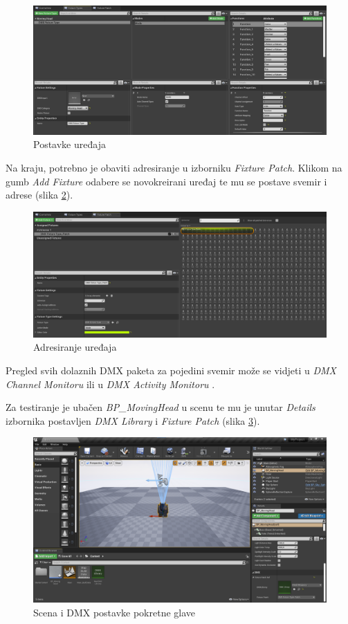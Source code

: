 \documentclass[times, utf8, zavrsni, numeric]{fer}
\begin{document}
\begin{figure}[htp]
	\centering
	\includegraphics[width=\linewidth]{slika 6-2.png}
	\caption{Postavke uređaja}
	\label{fig:slika 6-2}
\end{figure}

Na kraju, potrebno je obaviti adresiranje u izborniku \emph{Fixture Patch}. Klikom na gumb \emph{Add Fixture} odabere se novokreirani uređaj te mu se postave svemir i adrese (slika \ref{fig:slika 6-3}).

\begin{figure}[htp]
	\centering
	\includegraphics[width=\linewidth]{slika 6-3.png}
	\caption{Adresiranje uređaja}
	\label{fig:slika 6-3}
\end{figure}

Pregled svih dolaznih DMX paketa za pojedini svemir može se vidjeti u \emph{DMX Channel Monitoru} ili u \emph{DMX Activity Monitoru} \cite{dmx_quickstart}.\newline

Za testiranje je ubačen \emph{BP\_MovingHead} u scenu te mu je unutar \emph{Details} izbornika postavljen \emph{DMX Library} i \emph{Fixture Patch} (slika \ref{fig:slika 6-4}).

\begin{figure}[htp]
	\centering
	\includegraphics[width=\linewidth]{slika 6-4.png}
	\caption{Scena i DMX postavke pokretne glave}
	\label{fig:slika 6-4}
\end{figure}
\end{document}
